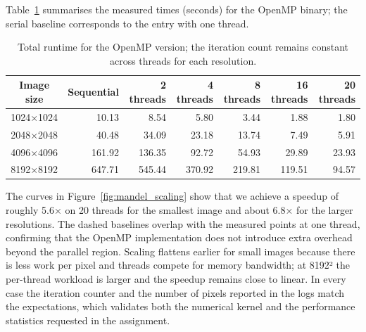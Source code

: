 Table~\ref{tab:mandel_times} summarises the measured times (seconds) for the OpenMP binary; the serial baseline corresponds to the entry with one thread.
\begin{table}[H]
    \centering
    \begin{tabular}{c|rrrrrr}
        \hline
        Image size & Sequential & 2 threads & 4 threads & 8 threads & 16 threads & 20 threads \\
        \hline
        1024×1024 & 10.13 & 8.54 & 5.80 & 3.44 & 1.88 & 1.80 \\
        2048×2048 & 40.48 & 34.09 & 23.18 & 13.74 & 7.49 & 5.91 \\
        4096×4096 & 161.92 & 136.35 & 92.72 & 54.93 & 29.89 & 23.93 \\
        8192×8192 & 647.71 & 545.44 & 370.92 & 219.81 & 119.51 & 94.57 \\
        \hline
    \end{tabular}
    \caption{Total runtime for the OpenMP version; the iteration count remains constant across threads for each resolution.}
    \label{tab:mandel_times}
\end{table}

The curves in Figure~\ref{fig:mandel_scaling} show that we achieve a speedup of roughly 5.6× on 20 threads for the smallest image and about 6.8× for the larger resolutions.  The dashed baselines overlap with the measured points at one thread, confirming that the OpenMP implementation does not introduce extra overhead beyond the parallel region.  Scaling flattens earlier for small images because there is less work per pixel and threads compete for memory bandwidth; at 8192² the per-thread workload is larger and the speedup remains close to linear.  In every case the iteration counter and the number of pixels reported in the logs match the expectations, which validates both the numerical kernel and the performance statistics requested in the assignment.
